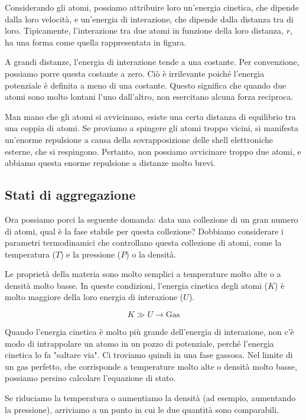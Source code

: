 Considerando gli atomi, possiamo attribuire loro un'energia cinetica, che dipende dalla loro velocità, e un'energia di interazione, che dipende dalla distanza tra di loro. Tipicamente, l'interazione tra due atomi in funzione della loro distanza, $r$, ha una forma come quella rappresentata in figura.

A grandi distanze, l'energia di interazione tende a una costante. Per convenzione, possiamo porre questa costante a zero. Ciò è irrilevante poiché l'energia potenziale è definita a meno di una costante. Questo significa che quando due atomi sono molto lontani l'uno dall'altro, non esercitano alcuna forza reciproca.

Man mano che gli atomi si avvicinano, esiste una certa distanza di equilibrio tra una coppia di atomi. Se proviamo a spingere gli atomi troppo vicini, si manifesta un'enorme repulsione a causa della sovrapposizione delle shell elettroniche esterne, che si respingono. Pertanto, non possiamo avvicinare troppo due atomi, e abbiamo questa enorme repulsione a distanze molto brevi.

\subsection*{Stati di aggregazione}

Ora possiamo porci la seguente domanda: data una collezione di un gran numero di atomi, qual è la fase stabile per questa collezione? Dobbiamo considerare i parametri termodinamici che controllano questa collezione di atomi, come la temperatura ($T$) e la pressione ($P$) o la densità.

Le proprietà della materia sono molto semplici a temperature molto alte o a densità molto basse. In queste condizioni, l'energia cinetica degli atomi ($K$) è molto maggiore della loro energia di interazione ($U$).

\begin{equation}
 K \gg U \rightarrow \text{Gas}
\end{equation}

Quando l'energia cinetica è molto più grande dell'energia di interazione, non c'è modo di intrappolare un atomo in un pozzo di potenziale, perché l'energia cinetica lo fa "saltare via". Ci troviamo quindi in una fase gassosa. Nel limite di un gas perfetto, che corrisponde a temperature molto alte o densità molto basse, possiamo persino calcolare l'equazione di stato.

Se riduciamo la temperatura o aumentiamo la densità (ad esempio, aumentando la pressione), arriviamo a un punto in cui le due quantità sono comparabili.

